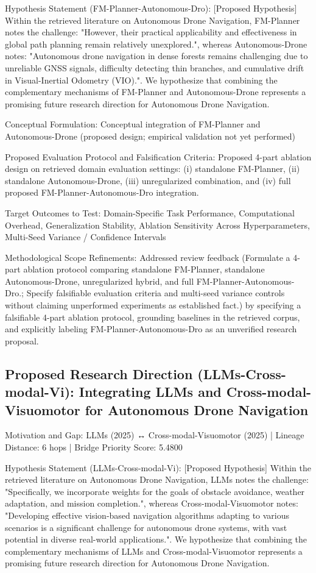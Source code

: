 \documentclass[10pt,twocolumn,letterpaper]{article}
\begin{document}
Hypothesis Statement (FM-Planner-Autonomous-Dro): [Proposed Hypothesis] Within the retrieved literature on Autonomous Drone Navigation, FM-Planner notes the challenge: "However, their practical applicability and effectiveness in global path planning remain relatively unexplored.", whereas Autonomous-Drone notes: "Autonomous drone navigation in dense forests remains challenging due to unreliable GNSS signals, difficulty detecting thin branches, and cumulative drift in Visual-Inertial Odometry (VIO).". We hypothesize that combining the complementary mechanisms of FM-Planner and Autonomous-Drone represents a promising future research direction for Autonomous Drone Navigation.

Conceptual Formulation: Conceptual integration of FM-Planner and Autonomous-Drone (proposed design; empirical validation not yet performed)

Proposed Evaluation Protocol and Falsification Criteria: Proposed 4-part ablation design on retrieved domain evaluation settings: (i) standalone FM-Planner, (ii) standalone Autonomous-Drone, (iii) unregularized combination, and (iv) full proposed FM-Planner-Autonomous-Dro integration.

Target Outcomes to Test: Domain-Specific Task Performance, Computational Overhead, Generalization Stability, Ablation Sensitivity Across Hyperparameters, Multi-Seed Variance / Confidence Intervals

Methodological Scope Refinements: Addressed review feedback (Formulate a 4-part ablation protocol comparing standalone FM-Planner, standalone Autonomous-Drone, unregularized hybrid, and full FM-Planner-Autonomous-Dro.; Specify falsifiable evaluation criteria and multi-seed variance controls without claiming unperformed experiments as established fact.) by specifying a falsifiable 4-part ablation protocol, grounding baselines in the retrieved corpus, and explicitly labeling FM-Planner-Autonomous-Dro as an unverified research proposal.

\subsection{Proposed Research Direction (LLMs-Cross-modal-Vi): Integrating LLMs and Cross-modal-Visuomotor for Autonomous Drone Navigation}
Motivation and Gap: LLMs (2025) ↔ Cross-modal-Visuomotor (2025) | Lineage Distance: 6 hops | Bridge Priority Score: 5.4800

Hypothesis Statement (LLMs-Cross-modal-Vi): [Proposed Hypothesis] Within the retrieved literature on Autonomous Drone Navigation, LLMs notes the challenge: "Specifically, we incorporate weights for the goals of obstacle avoidance, weather adaptation, and mission completion.", whereas Cross-modal-Visuomotor notes: "Developing effective vision-based navigation algorithms adapting to various scenarios is a significant challenge for autonomous drone systems, with vast potential in diverse real-world applications.". We hypothesize that combining the complementary mechanisms of LLMs and Cross-modal-Visuomotor represents a promising future research direction for Autonomous Drone Navigation.
\end{document}
